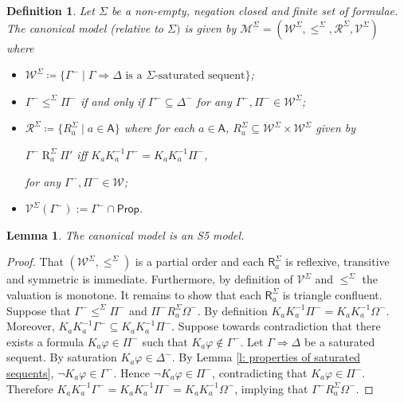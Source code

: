 \documentclass{myifcolog}
\newcommand{\K}{K}
\newcommand\Prop {\mathsf{Prop}}
\newcommand\R{\mathsf{R}}
\newcommand\A{\mathsf{A}}
\newcommand{\agi}{a}
\newcommand{\fw}{\mathcal{M}}
\newcommand{\Rel}{\mathrel{R}}
\newcommand{\W}{\mathcal{W}}
\newcommand{\rel}{\mathcal{R}}
\newcommand{\V}{\mathcal{V}}
\newtheorem{definition}[theorem]{Definition}
\newtheorem{lemma}[theorem]{Lemma}
\numberwithin{theorem}{section}
\begin{document}
\begin{definition}
    Let $\Sigma$ be a non-empty, negation closed and finite set of formulae. The \emph{canonical model} (relative to $\Sigma)$ is given by $\fw^\Sigma =(\W^\Sigma, \leq^\Sigma,\rel^\Sigma, \V^\Sigma)$ where
    \begin{itemize}
		\item $\W^\Sigma \coloneqq \{\Gamma^- \mid \Gamma \Rightarrow \Delta \text{ is a $\Sigma$-saturated sequent}\}$;
        \item $\Gamma^- \leq^\Sigma \Pi^-$ if and only if $\Gamma^- \subseteq \Delta^-$ for any $\Gamma^-,\Pi^- \in \W^\Sigma$;
        \item $\rel^\Sigma \coloneqq \{R_\agi^\Sigma \mid \agi \in \A\}$ where for each $\agi \in \A$, $R_\agi^\Sigma \subseteq \W^\Sigma \times \W^\Sigma$ given by 
        \begin{center}
            $\Gamma^- \Rel_\agi^\Sigma \Pi'$ iff $\K_\agi \K_\agi^{-1} \Gamma^- = \K_\agi \K_\agi^{-1} \Pi^-$,
        \end{center} 
        for any $\Gamma^-, \Pi^- \in \W$;
        \item $\V^\Sigma(\Gamma^-) := \Gamma^- \cap \Prop$. 
		\end{itemize}

\end{definition}

\begin{lemma}\label{l: canonical model is S5}
    The canonical model is an S5 model.
\end{lemma}
\begin{proof}
    That $(\W^\Sigma, \leq^\Sigma)$ is a partial order and each $\R_\agi^\Sigma$ is reflexive, transitive and symmetric is immediate. Furthermore, by definition of $\V^\Sigma$ and $\leq^\Sigma$ the valuation is monotone. It remains to show that each $\R_\agi^\Sigma$ is triangle confluent. Suppose that $\Gamma^- \leq^\Sigma \Pi^-$ and $\Pi^- \mathrel{R_\agi^\Sigma} \Omega^-$. By definition $\K_\agi \K_\agi^{-1} \Pi^- = \K_\agi \K_\agi^{-1}\Omega^-$. Moreover, $\K_\agi \K_\agi^{-1} \Gamma^- \subseteq \K_\agi \K_\agi^{-1} \Pi^-$. Suppose towards contradiction that there exists a formula $\K_\agi \varphi \in  \Pi^-$ such that $\K_\agi \varphi \not \in \Gamma^-$. Let $\Gamma \Rightarrow \Delta$ be a saturated sequent. By saturation $\K_\agi \varphi \in \Delta^-$. By Lemma \ref{l: properties of saturated sequents}, $\neg \K_\agi \varphi \in \Gamma^-$. Hence $\neg \K_\agi \varphi \in \Pi^-$, contradicting that $\K_\agi \varphi \in \Pi^-$. Therefore $\K_\agi \K_\agi^{-1} \Gamma^- = \K_\agi \K_\agi^{-1} \Pi^- = \K_\agi \K_\agi^{-1} \Omega^-$, implying that $\Gamma^- \mathrel{R_\agi^\Sigma} \Omega^-$.
\end{proof}
\end{document}
